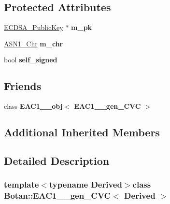 \subsection*{Protected Attributes}
\begin{DoxyCompactItemize}
\item 
\hypertarget{classBotan_1_1EAC1__1__gen__CVC_abf85ffcbb20162eb31b0f5ef2ee40014}{\hyperlink{classBotan_1_1ECDSA__PublicKey}{E\-C\-D\-S\-A\-\_\-\-Public\-Key} $\ast$ {\bfseries m\-\_\-pk}}\label{classBotan_1_1EAC1__1__gen__CVC_abf85ffcbb20162eb31b0f5ef2ee40014}

\item 
\hypertarget{classBotan_1_1EAC1__1__gen__CVC_ae06eec9841e8e50c7cc689eaa705da40}{\hyperlink{classBotan_1_1ASN1__Chr}{A\-S\-N1\-\_\-\-Chr} {\bfseries m\-\_\-chr}}\label{classBotan_1_1EAC1__1__gen__CVC_ae06eec9841e8e50c7cc689eaa705da40}

\item 
\hypertarget{classBotan_1_1EAC1__1__gen__CVC_a479f3b061f8a44b5564700498d926140}{bool {\bfseries self\-\_\-signed}}\label{classBotan_1_1EAC1__1__gen__CVC_a479f3b061f8a44b5564700498d926140}

\end{DoxyCompactItemize}
\subsection*{Friends}
\begin{DoxyCompactItemize}
\item 
\hypertarget{classBotan_1_1EAC1__1__gen__CVC_a853ff08d1f56abca22182b6374658045}{class {\bfseries E\-A\-C1\-\_\-\_\-obj$<$ E\-A\-C1\-\_\-\_\-gen\-\_\-\-C\-V\-C $>$}}\label{classBotan_1_1EAC1__1__gen__CVC_a853ff08d1f56abca22182b6374658045}

\end{DoxyCompactItemize}
\subsection*{Additional Inherited Members}


\subsection{Detailed Description}
\subsubsection*{template$<$typename Derived$>$class Botan\-::\-E\-A\-C1\-\_\-\_\-gen\-\_\-\-C\-V\-C$<$ Derived $>$}

